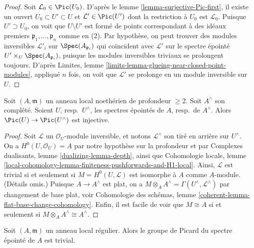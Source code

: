 \begin{proof}
Soit $\mathcal{L}_0 \in \Pic(U_0)$. D'après le
lemme \ref{lemma-surjective-Pic-first},
il existe un ouvert $U_0 \subset U' \subset U$
et $\mathcal{L}' \in \Pic(U')$ dont la restriction
à $U_0$ est $\mathcal{L}_0$.
Puisque $U' \supset U_0$, on voit que $U \setminus U'$
est formé de points correspondant à des idéaux premiers
$\mathfrak p_1, \ldots, \mathfrak p_n$ comme en (2).
Par hypothèse, on peut trouver des modules inversibles
$\mathcal{L}'_i$ sur $\Spec(A_{\mathfrak p_i})$ qui coïncident avec
$\mathcal{L}'$ sur le spectre épointé
$U' \times_U \Spec(A_{\mathfrak p_i})$, puisque
les modules inversibles triviaux se prolongent toujours.
D'après Limites, lemme \ref{limits-lemma-glueing-near-closed-point-modules},
appliqué $n$ fois, on voit que $\mathcal{L}'$ se prolonge en un
module inversible sur $U$.
\end{proof}

\begin{lemma}
\label{lemma-local-pic-to-completion}
Soit $(A, \mathfrak m)$ un anneau local noethérien de profondeur $\geq 2$.
Soit $A^\wedge$ son complété. Soient $U$, resp.\ $U^\wedge$,
les spectres épointés de $A$, resp.\ de $A^\wedge$. Alors
$\Pic(U) \to \Pic(U^\wedge)$ est injective.
\end{lemma}

\begin{proof}
Soit $\mathcal{L}$ un $\mathcal{O}_U$-module inversible,
et notons $\mathcal{L}^\wedge$ son tiré en arrière sur $U^\wedge$.
On a $H^0(U, \mathcal{O}_U) = A$ par notre hypothèse sur la profondeur et par
Complexes dualisants, lemme \ref{dualizing-lemma-depth}, ainsi que
Cohomologie locale, lemme
\ref{local-cohomology-lemma-finiteness-pushforwards-and-H1-local}.
Ainsi, $\mathcal{L}$ est trivial si et seulement si
$M = H^0(U, \mathcal{L})$ est isomorphe à $A$ comme $A$-module.
(Détails omis.) Puisque $A \to A^\wedge$ est plat,
on a $M \otimes_A A^\wedge = \Gamma(U^\wedge, \mathcal{L}^\wedge)$
par changement de base plat, voir
Cohomologie des schémas, lemme \ref{coherent-lemma-flat-base-change-cohomology}.
Enfin, il est facile de voir que $M \cong A$ si et seulement si
$M \otimes_A A^\wedge \cong A^\wedge$.
\end{proof}

\begin{lemma}
\label{lemma-trivial-local-pic-regular}
Soit $(A, \mathfrak m)$ un anneau local régulier. Alors le groupe de Picard
du spectre épointé de $A$ est trivial.
\end{lemma}

